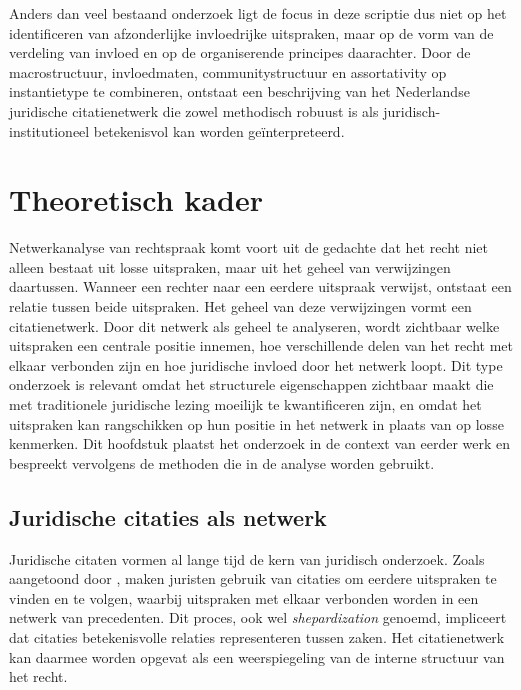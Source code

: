 \documentclass[a4paper, 12pt]{report}
\begin{document}
Anders dan veel bestaand onderzoek ligt de focus in deze scriptie dus niet op het identificeren van afzonderlijke invloedrijke uitspraken, maar op de vorm van de verdeling van invloed en op de organiserende principes daarachter. Door de macrostructuur, invloedmaten, communitystructuur en assortativity op instantietype te combineren, ontstaat een beschrijving van het Nederlandse juridische citatienetwerk die zowel methodisch robuust is als juridisch-institutioneel betekenisvol kan worden geïnterpreteerd.

\chapter{Theoretisch kader}
\label{ch:kader}

Netwerkanalyse van rechtspraak komt voort uit de gedachte dat het recht niet alleen bestaat uit losse uitspraken, maar uit het geheel van verwijzingen daartussen. Wanneer een rechter naar een eerdere uitspraak verwijst, ontstaat een relatie tussen beide uitspraken. Het geheel van deze verwijzingen vormt een citatienetwerk. Door dit netwerk als geheel te analyseren, wordt zichtbaar welke uitspraken een centrale positie innemen, hoe verschillende delen van het recht met elkaar verbonden zijn en hoe juridische invloed door het netwerk loopt. Dit type onderzoek is relevant omdat het structurele eigenschappen zichtbaar maakt die met traditionele juridische lezing moeilijk te kwantificeren zijn, en omdat het uitspraken kan rangschikken op hun positie in het netwerk in plaats van op losse kenmerken. Dit hoofdstuk plaatst het onderzoek in de context van eerder werk en bespreekt vervolgens de methoden die in de analyse worden gebruikt.


\section{Juridische citaties als netwerk}

Juridische citaten vormen al lange tijd de kern van juridisch onderzoek. Zoals aangetoond door \textcite{marx1970}, maken juristen gebruik van citaties om eerdere uitspraken te vinden en te volgen, waarbij uitspraken met elkaar verbonden worden in een netwerk van precedenten. Dit proces, ook wel \textit{shepardization} genoemd, impliceert dat citaties betekenisvolle relaties representeren tussen zaken. Het citatienetwerk kan daarmee worden opgevat als een weerspiegeling van de interne structuur van het recht.
\end{document}
